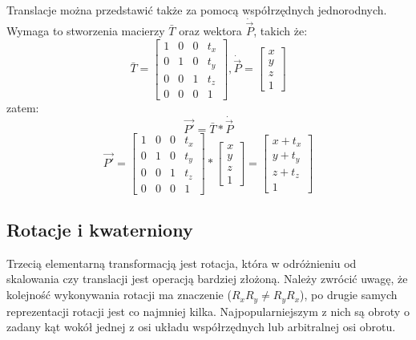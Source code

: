 \documentclass[licencjacka]{pracamgr}
\begin{document}
Translacje można przedstawić także za pomocą współrzędnych jednorodnych. Wymaga to stworzenia macierzy $\bar{T}$ oraz wektora $\dot{\vec{P}}$, takich że:
$$
\bar{T}
=
\begin{bmatrix}
1 & 0 & 0 & t_x \\
0 & 1 & 0 & t_y \\
0 & 0 & 1 & t_z \\
0 & 0 & 0 & 1
\end{bmatrix}
,
\dot{\vec{P}}
=
\begin{bmatrix}
x \\
y \\
z \\
1
\end{bmatrix}
$$
zatem:
$$
\vec{P'}=\bar{T}*\dot{\vec{P}}
$$
$$
\vec{P'}=
\begin{bmatrix}
1 & 0 & 0 & t_x \\
0 & 1 & 0 & t_y \\
0 & 0 & 1 & t_z \\
0 & 0 & 0 & 1
\end{bmatrix}
*
\begin{bmatrix}
x \\
y \\
z \\
1
\end{bmatrix}
=
\begin{bmatrix}
x+t_x \\
y+t_y \\
z+t_z \\
1
\end{bmatrix}
$$
\subsection{Rotacje i kwaterniony}
Trzecią elementarną transformacją jest rotacja, która w odróżnieniu od skalowania czy translacji jest operacją bardziej złożoną. Należy zwrócić uwagę, że kolejność wykonywania rotacji ma znaczenie ($R_xR_y\neq R_yR_x$), po drugie samych reprezentacji rotacji jest co najmniej kilka. Najpopularniejszym z nich są obroty o zadany kąt wokół jednej z osi układu współrzędnych lub arbitralnej osi obrotu.
\end{document}

